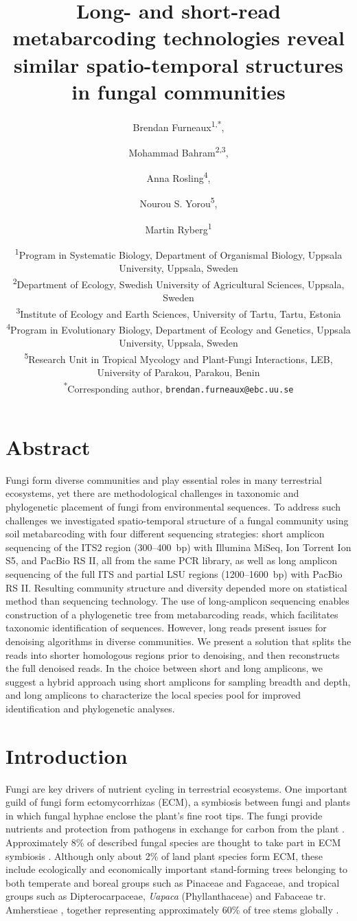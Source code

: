 \documentclass[
  12pt,
]{article}
\title{Long- and short-read metabarcoding technologies reveal similar spatio-temporal structures in fungal communities}
\author{Brendan Furneaux\textsuperscript{1,*}, \and Mohammad Bahram\textsuperscript{2,3}, \and Anna Rosling\textsuperscript{4}, \and Nourou S. Yorou\textsuperscript{5}, \and Martin Ryberg\textsuperscript{1}}
\date{\textsuperscript{1}Program in Systematic Biology, Department of Organismal Biology, Uppsala University, Uppsala, Sweden\\
\textsuperscript{2}Department of Ecology, Swedish University of Agricultural Sciences, Uppsala, Sweden\\
\textsuperscript{3}Institute of Ecology and Earth Sciences, University of Tartu, Tartu, Estonia\\
\textsuperscript{4}Program in Evolutionary Biology, Department of Ecology and Genetics, Uppsala University, Uppsala, Sweden\\
\textsuperscript{5}Research Unit in Tropical Mycology and Plant-Fungi Interactions, LEB, University of Parakou, Parakou, Benin\\
\textsuperscript{*}Corresponding author, \texttt{brendan.furneaux@ebc.uu.se}}
\begin{document}
\maketitle

\hypertarget{abstract}{%
\section*{Abstract}\label{abstract}}

Fungi form diverse communities and play essential roles in many terrestrial ecosystems, yet there are methodological challenges in taxonomic and phylogenetic placement of fungi from environmental sequences.
To address such challenges we investigated spatio-temporal structure of a fungal community using soil metabarcoding with four different sequencing strategies: short amplicon sequencing of the ITS2 region (300--400~bp) with Illumina MiSeq, Ion Torrent Ion S5, and PacBio RS II, all from the same PCR library, as well as long amplicon sequencing of the full ITS and partial LSU regions (1200--1600~bp) with PacBio RS II.
Resulting community structure and diversity depended more on statistical method than sequencing technology.
The use of long-amplicon sequencing enables construction of a phylogenetic tree from metabarcoding reads, which facilitates taxonomic identification of sequences.
However, long reads present issues for denoising algorithms in diverse communities.
We present a solution that splits the reads into shorter homologous regions prior to denoising, and then reconstructs the full denoised reads.
In the choice between short and long amplicons, we suggest a hybrid approach using short amplicons for sampling breadth and depth, and long amplicons to characterize the local species pool for improved identification and phylogenetic analyses.

\hypertarget{introduction}{%
\section{Introduction}\label{introduction}}

Fungi are key drivers of nutrient cycling in terrestrial ecosystems.
One important guild of fungi form ectomycorrhizas (ECM), a symbiosis between fungi and plants in which fungal hyphae enclose the plant's fine root tips.
The fungi provide nutrients and protection from pathogens in exchange for carbon from the plant \autocite{Smith2010}.
Approximately 8\% of described fungal species are thought to take part in ECM symbiosis \autocite{ainsworth2008ainsworth,Rinaldi2008}.
Although only about 2\% of land plant species form ECM, these include ecologically and economically important stand-forming trees belonging to both temperate and boreal groups such as Pinaceae and Fagaceae, and tropical groups such as Dipterocarpaceae, \emph{Uapaca} (Phyllanthaceae) and Fabaceae tr. Amherstieae \autocite{brundrett2017a}, together representing approximately 60\% of tree stems globally \autocite{steidinger2019}.
\end{document}
